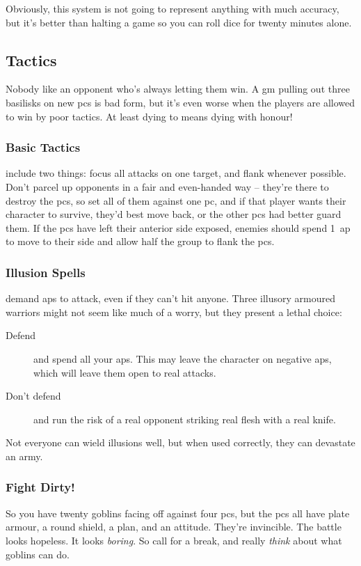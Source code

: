 \begin{multicols}{2}
Obviously, this system is not going to represent anything with much accuracy, but it's better than halting a game so you can roll dice for twenty minutes alone.

\subsection{Tactics}

Nobody like an opponent who's always letting them win.
A \gls{gm} pulling out three \glspl{basilisk} on new \glspl{pc} is bad form, but it's even worse when the players are allowed to win by poor tactics.
At least dying to  means dying with honour!

\subsubsection{Basic Tactics}
include two things: focus all attacks on one target, and flank whenever possible.
Don't parcel up opponents in a fair and even-handed way -- they're there to destroy the \glspl{pc}, so set all of them against one \gls{pc}, and if that player wants their character to survive, they'd best move back, or the other \glspl{pc} had better guard them.%
If the \glspl{pc} have left their anterior side exposed, enemies should spend 1~\gls{ap} to move to their side and allow half the group to flank the \glspl{pc}.

\subsubsection{Illusion Spells}
demand \glspl{ap} to attack, even if they can't hit anyone.
Three illusory armoured warriors might not seem like much of a worry, but they present a lethal choice:

\begin{description}
  \item[Defend]
  and spend all your \glspl{ap}.
  This may leave the character on negative \glspl{ap}, which will leave them open to real attacks.
  \item[Don't defend]
  and run the risk of a real opponent striking real flesh with a real knife. 
\end{description}

Not everyone can wield illusions well, but when used correctly, they can devastate an army.

\subsubsection{Fight Dirty!}
So you have twenty goblins facing off against four \glspl{pc}, but the \glspl{pc} all have plate armour, a round shield, a plan, and an attitude.
They're invincible.
The battle looks hopeless.
It looks \emph{boring}.
So call for a break, and really \emph{think} about what goblins can do.


\end{multicols}

